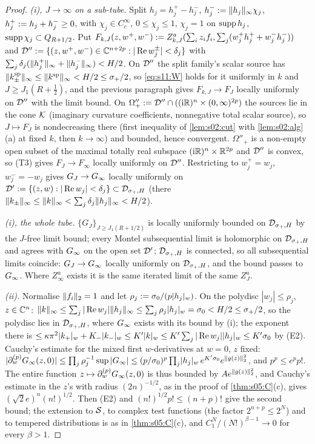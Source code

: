 \begin{proof}
\emph{(i), $J\to\infty$ on a sub-tube.} Split $h_j=h_j^+-h_j^-$, $h_j^-:=\lVert h_j\rVert_\infty\chi_j$, $h_j^+:= h_j+h_j^-\ge0$, with $\chi_j\in C^\infty_c$, $0\le\chi_j\le1$, $\chi_j=1$ on $\operatorname{supp} h_j$, $\operatorname{supp}\chi_j\subset Q_{R+1/2}$. Put $F_{k,J}(z,w^+,w^-):= Z^a_{k,J}(\sum_iz_if_i,\sum_j(w_j^+h_j^++w_j^-h_j^-))$ and $\mathcal D'':=\{(z,w^+,w^-)\in\mathbb C^{n+2p}:|\operatorname{Re} w^\pm_j|<\delta_j\}$ with $\sum_j\delta_j(\lVert h_j^+\rVert_\infty+\lVert h_j^-\rVert_\infty)<H/2$. On $\mathcal D''$ the split family's scalar source has $\lVert k^{\rm sp}_\pm\rVert_\infty\le\lVert k^{\rm sp}\rVert_\infty<H/2\le\sigma_+/2$, so \eqref{eq:s11:W} holds for it uniformly in $k$ and $J\ge J_1(R+\frac12)$, and the previous paragraph gives $F_{k,J}\to F_J$ locally uniformly on $\mathcal D''$ with the limit bound. On $\Omega''_+:=\mathcal D''\cap((\mathrm i\mathbb R)^n\times(0,\infty)^{2p})$ the sources lie in the cone $\mathcal K$ (imaginary curvature coefficients, nonnegative total scalar source), so $J\mapsto F_J$ is nondecreasing there (first inequality of \cref{lem:s02:cut} with \cref{lem:s02:alg}(a) at fixed $k$, then $k\to\infty$) and bounded, hence convergent. $\Omega''_+$ is a non-empty open subset of the maximal totally real subspace $(\mathrm i\mathbb R)^n\times\mathbb R^{2p}$ and $\mathcal D''$ is convex, so (T3) gives $F_J\to F_\infty$ locally uniformly on $\mathcal D''$. Restricting to $w^+_j=w_j$, $w^-_j=-w_j$ gives $G_J\to G_\infty$ locally uniformly on $\mathcal D':=\{(z,w):|\operatorname{Re} w_j|<\delta_j\}\subset\mathcal D_{\sigma_+,H}$ (there $\lVert k_\pm\rVert_\infty\le\lVert k\rVert_\infty<\sum_j\delta_j\lVert h_j\rVert_\infty<H/2$).

\emph{(i), the whole tube.} $\{G_J\}_{J\ge J_1(R+1/2)}$ is locally uniformly bounded on $\mathcal D_{\sigma_+,H}$ by the $J$-free limit bound; every Montel subsequential limit is holomorphic on $\mathcal D_{\sigma_+,H}$ and agrees with $G_\infty$ on the open set $\mathcal D'$; $\mathcal D_{\sigma_+,H}$ is connected, so all subsequential limits coincide: $G_J\to G_\infty$ locally uniformly on $\mathcal D_{\sigma_+,H}$, and the bound passes to $G_\infty$. Where $Z^a_\infty$ exists it is the same iterated limit of the same $Z^a_J$.

\emph{(ii).} Normalise $\lVert f_i\rVert_2=1$ and let $\rho_j:=\sigma_0/(p\lvert h_j\rvert_{w})$. On the polydisc $|w_j|\le\rho_j$, $z\in\mathbb C^n$: $\lVert k\rVert_\infty\le\sum_j|\operatorname{Re} w_j|\lVert h_j\rVert_\infty\le\sum_j\rho_j\lvert h_j\rvert_{w}=\sigma_0<H/2\le\sigma_+/2$, so the polydisc lies in $\mathcal D_{\sigma_+,H}$, where $G_\infty$ exists with its bound by (i); the exponent there is $\le\kappa\pi^2\lvert k_+\rvert_{w}+K_-\lvert k_-\rvert_{w}\le K'\lvert k\rvert_{w}\le K'\sum_j|\operatorname{Re} w_j|\lvert h_j\rvert_{w}\le K'\sigma_0$ by (E2). Cauchy's estimate for the mixed first $w$-derivatives at $w=0$, $z$ fixed: $|\partial^{(p)}_wG_\infty(z,0)|\le\prod_j\rho_j^{-1}\sup|G_\infty|\le(p/\sigma_0)^p\prod_j\lvert h_j\rvert_{w}\,e^{K'\sigma_0}e^{\lVert g(z)\rVert_2^2}$, and $p^p\le e^pp!$. The entire function $z\mapsto\partial^{(p)}_wG_\infty(z,0)$ is thus bounded by $Ae^{\lVert g(z)\rVert_2^2}$, and Cauchy's estimate in the $z$'s with radius $(2n)^{-1/2}$, as in the proof of \cref{thm:s05:C}(c), gives $(\sqrt2e)^n(n!)^{1/2}$. Then (E2) and $(n!)^{1/2}p!\le(n+p)!$ give the second bound; the extension to $\mathcal S$, to complex test functions (the factor $2^{n+p}\le2^N$) and to tempered distributions is as in \cref{thm:s05:C}(c), and $C_1^N/(N!)^{\beta-1}\to0$ for every $\beta>1$.
\end{proof}

